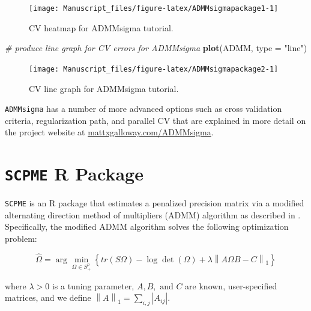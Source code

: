 \documentclass[11pt,]{report}
\newenvironment{Shaded}{\begin{snugshade}}{\end{snugshade}}
\newcommand{\CommentTok}[1]{\textcolor[rgb]{0.56,0.35,0.01}{\textit{#1}}}
\newcommand{\DataTypeTok}[1]{\textcolor[rgb]{0.13,0.29,0.53}{#1}}
\newcommand{\KeywordTok}[1]{\textcolor[rgb]{0.13,0.29,0.53}{\textbf{#1}}}
\newcommand{\NormalTok}[1]{#1}
\newcommand{\StringTok}[1]{\textcolor[rgb]{0.31,0.60,0.02}{#1}}
\theoremstyle{definition}
\theoremstyle{definition}
\theoremstyle{definition}
\theoremstyle{remark}
\begin{document}
\begin{figure}

{\centering \texttt{[image: Manuscript\_files/figure-latex/ADMMsigmapackage1-1]} 

}

\caption{CV heatmap for ADMMsigma tutorial.}\label{fig:ADMMsigmapackage1}
\end{figure}

\begin{Shaded}
\begin{Highlighting}[]
\CommentTok{# produce line graph for CV errors for ADMMsigma}
\KeywordTok{plot}\NormalTok{(ADMM, }\DataTypeTok{type =} \StringTok{"line"}\NormalTok{)}
\end{Highlighting}
\end{Shaded}

\begin{figure}

{\centering \texttt{[image: Manuscript\_files/figure-latex/ADMMsigmapackage2-1]} 

}

\caption{CV line graph for ADMMsigma tutorial.}\label{fig:ADMMsigmapackage2}
\end{figure}

\vspace{0.5cm}

\texttt{ADMMsigma} has a number of more advanced options such as cross validation criteria, regularization path, and parallel CV that are explained in more detail on the project website at \href{http://mattxgalloway.com/ADMMsigma/}{mattxgalloway.com/ADMMsigma}.

\hypertarget{scpme-r-package}{%
\chapter{\texorpdfstring{\texttt{SCPME} R Package}{SCPME R Package}}\label{scpme-r-package}}

\texttt{SCPME} is an R package that estimates a penalized precision matrix via a modified alternating direction method of multipliers (ADMM) algorithm as described in \citet{molstad2017shrinking}. Specifically, the modified ADMM algorithm solves the following optimization problem:

\[ \hat{\Omega} = \arg\min_{\Omega \in S_{+}^{p}}\left\{ tr\left(S \Omega\right) - \log\det\left(\Omega\right) + \lambda\left\| A\Omega B - C \right\|_{1} \right\} \]

where \(\lambda > 0\) is a tuning parameter, \(A, B, \mbox{ and } C\) are known, user-specified matrices, and we define \(\left\|A \right\|_{1} = \sum_{i, j} \left| A_{ij} \right|\).
\end{document}
